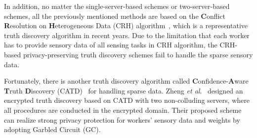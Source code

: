 \documentclass[conference]{IEEEtran}
\begin{document}
In addition, no matter the single-server-based schemes or two-server-based schemes, all the previously mentioned methods are based on the {\bf C}onflict {\bf R}esolution on {\bf H}eterogeneous Data (CRH) algorithm~\cite{li_resolving_2014}, which is a representative truth discovery algorithm in recent years.
Due to the limitation that each worker has to provide sensory data of all sensing tasks in CRH algorithm, the CRH-based privacy-preserving truth discovery schemes fail to handle the sparse sensory data.

Fortunately, there is another truth discovery algorithm called {\bf C}onfidence-{\bf A}ware {\bf T}ruth {\bf D}iscovery (CATD)~\cite{li_confidence-aware_2014} for handling sparse data.
Zheng {\em et al}.~\cite{zheng_learning_2018} designed an encrypted truth discovery based on CATD with two non-colluding servers, where all procedures are conducted in the encrypted domain.
Their proposed scheme can realize strong privacy protection for workers' sensory data and weights by adopting Garbled Circuit (GC).
\end{document}
